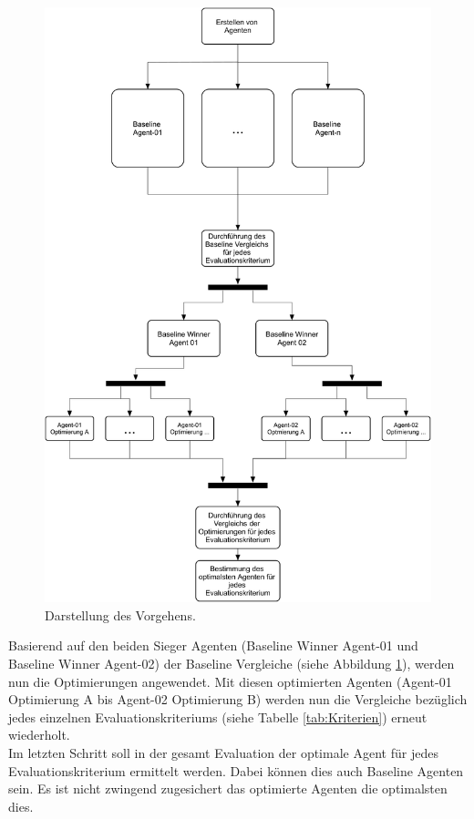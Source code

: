 \begin{figure}[H]
	\centering
	\includegraphics[scale=0.11]{Abbildungen/Vorgehen.png}
	\caption[Flussdiagramm des Vorgehens]{Darstellung des Vorgehens.}
	\label{fig:Vorgehen}
\end{figure}
Basierend auf den beiden Sieger Agenten (Baseline Winner Agent-01 und Baseline Winner Agent-02) der Baseline Vergleiche (siehe Abbildung \ref{fig:Vorgehen}), werden nun die Optimierungen angewendet. 
Mit diesen optimierten Agenten (Agent-01 Optimierung A bis Agent-02 Optimierung B) werden nun die Vergleiche bezüglich jedes einzelnen Evaluationskriteriums (siehe Tabelle \ref{tab:Kriterien}) erneut wiederholt.\\
Im letzten Schritt soll in der gesamt Evaluation der optimale Agent für jedes Evaluationskriterium ermittelt werden. Dabei können dies auch Baseline Agenten sein. Es ist nicht zwingend zugesichert das optimierte Agenten die optimalsten dies.

